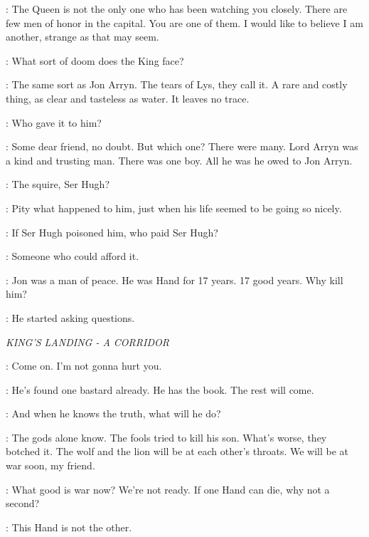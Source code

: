 \VARYS: The Queen is not the only one who has been watching you closely. There are few men of honor in the capital. You are one of them. I would like to believe I am another, strange as that may seem. 

\NED: What sort of doom does the King face? 

\VARYS: The same sort as Jon Arryn. The tears of Lys, they call it. A rare and costly thing, as clear and tasteless as water. It leaves no trace. 

\NED: Who gave it to him? 

\VARYS: Some dear friend, no doubt. But which one? There were many. Lord Arryn was a kind and trusting man. There was one boy.  All he was he owed to Jon Arryn. 

\NED: The squire, Ser Hugh? 

\VARYS: Pity what happened to him, just when his life seemed to be going so nicely. 

\NED: If Ser Hugh poisoned him, who paid Ser Hugh? 

\VARYS: Someone who could afford it. 

\NED: Jon was a man of peace. He was Hand for 17 years. 17 good years. Why kill him? 

\VARYS: He started asking questions. 


\scene

\textit{KING'S LANDING - A CORRIDOR} 


\ARYA: Come on. I'm not gonna hurt you. 


\VARYS: He's found one bastard already. He has the book. The rest will come. 

\ILLYRIO: And when he knows the truth, what will he do? 

\VARYS: The gods alone know. The fools tried to kill his son. What's worse, they botched it.  The wolf and the lion will be at each other's throats. We will be at war soon, my friend. 

\ILLYRIO: What good is war now? We're not ready. If one Hand can die, why not a second? 

\VARYS: This Hand is not the other. 

